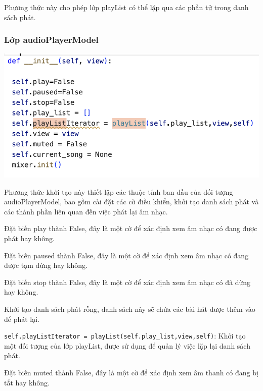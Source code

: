 \documentclass[a4paper]{article}
\begin{document}
\hspace*{0.5cm} Phương thức này cho phép lớp playList có thể lặp qua các phần tử trong danh sách phát.

\subsubsection{Lớp audioPlayerModel}

\begin{center}
\includegraphics[width=175mm]{template_SGU 2/khoitao_audioPlaymodel.png}
\end{center}

\hspace*{0.5cm} Phương thức khởi tạo này thiết lập các thuộc tính ban đầu của đối tượng audioPlayerModel, bao gồm cài đặt các cờ điều khiển, khởi tạo danh sách phát và các thành phần liên quan đến việc phát lại âm nhạc.

\hspace*{0.5} Đặt biến play thành False, đây là một cờ để xác định xem âm nhạc có đang được phát hay không.

\hspace*{0.5} Đặt biến paused thành False, đây là một cờ để xác định xem âm nhạc có đang được tạm dừng hay không.

\hspace*{0.5} Đặt biến stop thành False, đây là một cờ để xác định xem âm nhạc có đã dừng hay không.

\hspace*{0.5} Khởi tạo danh sách phát rỗng, danh sách này sẽ chứa các bài hát được thêm vào để phát lại.

\hspace*{0.5} \texttt{self.playListIterator = playList(self.play\_list,view,self)}: Khởi tạo một đối tượng của lớp playList, được sử dụng để quản lý việc lặp lại danh sách phát.

\hspace*{0.5} Đặt biến muted thành False, đây là một cờ để xác định xem âm thanh có đang bị tắt hay không.
\end{document}
